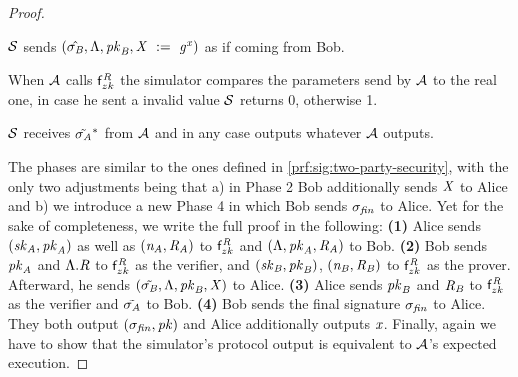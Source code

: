 \begin{proof}
\begin{asparaenum}
        \item $\mathcal{S}$ sends $(\hat{\sigma_{\mathit{B}}}, \Lambda, \mathit{pk}_{\mathit{B}}, \mathit{X} ~:=~ \mathit{g}^{\mathit{x}})$ as if coming from Bob.
        \item When $\mathcal{A}$ calls $\mathsf{f}^{\mathit{R}}_{zk}$ the simulator compares the parameters send by $\mathcal{A}$ to the real one, in case he sent a invalid value $\mathcal{S}$ returns 0, otherwise 1.
        \item $\mathcal{S}$ receives $\tilde{\sigma_{\mathit{A}}}^*$ from $\mathcal{A}$ and in any case outputs whatever $\mathcal{A}$ outputs.
    \end{asparaenum}

    The phases are similar to the ones defined in \cref{prf:sig:two-party-security}, with the only two adjustments being that a) in Phase 2 Bob additionally sends $\mathit{X}$ to Alice and b) we introduce a new Phase 4 in which Bob sends $\sigma_{\mathit{fin}}$ to Alice.
    Yet for the sake of completeness, we write the full proof in the following:
    \textbf{(1)} Alice sends $(\mathit{sk}_{\mathit{A}}, \mathit{pk}_{\mathit{A}})$ as well as $(\mathit{\mathit{n}_{\mathit{A}}}, \mathit{R}_{\mathit{A}})$ to $\mathsf{f}^{\mathit{R}}_{zk}$ and $(\Lambda, \mathit{pk}_{\mathit{A}}, \mathit{R}_{\mathit{A}})$ to Bob.
    \textbf{(2)} Bob sends $\mathit{pk}_{\mathit{A}}$ and $\Lambda.\mathit{R}$ to $\mathsf{f}^{\mathit{R}}_{zk}$ as the verifier, and  $(\mathit{sk}_{\mathit{B}}, \mathit{pk}_{\mathit{B}})$, $(\mathit{\mathit{n}_{\mathit{B}}}, \mathit{R}_{\mathit{B}})$ to $\mathsf{f}^{\mathit{R}}_{zk}$ as the prover.
    Afterward, he sends $(\tilde{\sigma_{\mathit{B}}}, \Lambda, \mathit{pk}_{\mathit{B}}, \mathit{X})$ to Alice.
    \textbf{(3)} Alice sends $\mathit{pk}_{\mathit{B}}$ and $\mathit{R}_{\mathit{B}}$ to $\mathsf{f}^{\mathit{R}}_{zk}$ as the verifier and $\tilde{\sigma_{\mathit{A}}}$ to Bob.
    \textbf{(4)} Bob sends the final signature $\sigma_{\mathit{fin}}$ to Alice.
    They both output $(\sigma_{\mathit{fin}}, \mathit{pk})$ and Alice additionally outputs $\mathit{x}$.
    Finally, again we have to show that the simulator's protocol output is equivalent to $\mathcal{A}$'s expected execution.


\end{proof}
